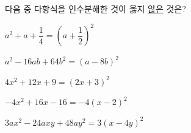 다음 중 다항식을 인수분해한 것이 옳지 \underline{않은} 것은?
\begin{choicesv}{\rule[-3ex]{0pt}{8ex}$a^2+a+\dfrac{1}{4}=\left(a+\dfrac{1}{2}\right)^2$}{\rule[-3ex]{0pt}{8ex}$a^2-16ab+64b^2=(a-8b)^2$}{\rule[-3ex]{0pt}{8ex}$4x^2+12x+9=(2x+3)^2$}{\rule[-3ex]{0pt}{8ex}$-4x^2+16x-16=-4(x-2)^2$}{\rule[-3ex]{0pt}{8ex}$3ax^2-24axy+48ay^2=3(x-4y)^2$}\end{choicesv}
